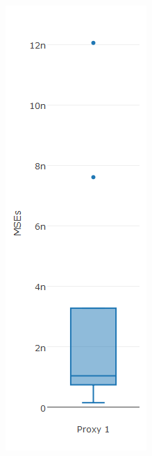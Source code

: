 \begin{figure}[!h]
{\begin{subfigure}{.25\linewidth}
  \includegraphics[width=\linewidth]{img/10ysigmaMsebpKnn.png}

\end{subfigure}}
\end{figure}
